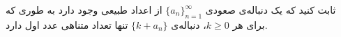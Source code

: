 ثابت کنید که یک دنباله‌ی صعودی $\{a_{n}\}_{n=1}^{\infty}$ از اعداد طبیعی وجود دارد به طوری که برای هر $k \geq 0$، دنباله‌ی $\{k + a_{n}\}$ تنها تعداد متناهی عدد اول دارد.
